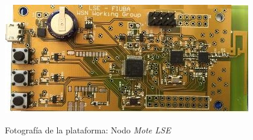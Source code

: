 \vspace{10px}

\begin{figure}[h!]
	\centering
    \includegraphics[width=.8\textwidth]{./Figures/mote.jpg}
	\label{fig:mote}
	\caption{Fotografía de la plataforma: Nodo \textit{Mote LSE}}
\end{figure}

